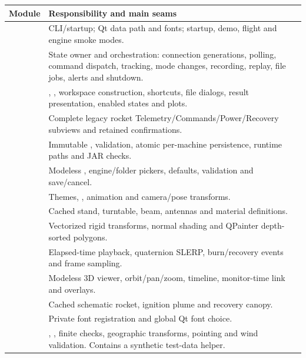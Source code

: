 \begin{longtable}{@{}L{.29\linewidth}L{.64\linewidth}@{}}
\toprule Module & Responsibility and main seams \\\midrule\endhead
{} & CLI/startup; Qt data path and fonts; startup, demo, flight and engine smoke modes. \\
 & State owner and orchestration: connection generations, polling, command dispatch, tracking, mode changes, recording, replay, file jobs, alerts and shutdown. \\
 & , , workspace construction, shortcuts, file dialogs, result presentation, enabled states and plots. \\
 & Complete legacy rocket Telemetry/Commands/Power/Recovery subviews and retained confirmations. \\
 & Immutable , validation, atomic per-machine persistence, runtime paths and JAR checks. \\
 & Modeless , engine/folder pickers, defaults, validation and save/cancel. \\
 & Themes, , animation and camera/pose transforms. \\
 & Cached stand, turntable, beam, antennas and material definitions. \\
 & Vectorized rigid transforms, normal shading and QPainter depth-sorted polygons. \\
 & Elapsed-time playback, quaternion SLERP, burn/recovery events and frame sampling. \\
 & Modeless 3D viewer, orbit/pan/zoom, timeline, monitor-time link and overlays. \\
 & Cached schematic rocket, ignition plume and recovery canopy. \\
 & Private font registration and global Qt font choice. \\
 & , , finite checks, geographic transforms, pointing and wind validation. Contains a synthetic test-data helper. \\

\end{longtable}
